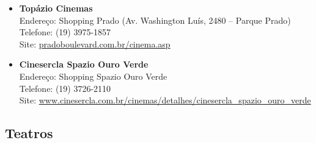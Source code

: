 \begin{itemize}
    \item   \textbf{Topázio Cinemas}
        \\Endereço: Shopping Prado (Av. Washington Luís, 2480 -- Parque Prado)
        \\Telefone: (19) 3975-1857
        \\Site: \url{pradoboulevard.com.br/cinema.asp}

    \item   \textbf{Cinesercla Spazio Ouro Verde}
        \\Endereço: Shopping Spazio Ouro Verde
        \\Telefone: (19) 3726-2110
        \\Site: \url{www.cinesercla.com.br/cinemas/detalhes/cinesercla_spazio_ouro_verde}

\end{itemize}

\subsection{Teatros}

